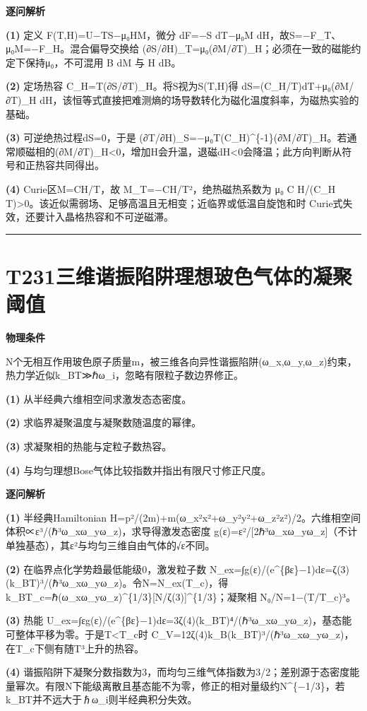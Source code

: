 \documentclass[UTF8,a4paper,11pt,oneside,openany]{ctexbook}
\begin{document}
\par\medskip\noindent\textbf{逐问解析}
\par\noindent\textbf{(1)} 定义 F(T,H)=U−TS−μ₀HM，微分 dF=−S dT−μ₀M dH，故S=−F\_T、μ₀M=−F\_H。混合偏导交换给 (∂S/∂H)\_T=μ₀(∂M/∂T)\_H；必须在一致的磁能约定下保持μ₀，不可混用 B dM 与 H dB。
\par\noindent\textbf{(2)} 定场热容 C\_H=T(∂S/∂T)\_H。将S视为S(T,H)得 dS=(C\_H/T)dT+μ₀(∂M/∂T)\_H dH，该恒等式直接把难测熵的场导数转化为磁化温度斜率，为磁热实验的基础。
\par\noindent\textbf{(3)} 可逆绝热过程dS=0，于是 (∂T/∂H)\_S=−μ₀T(C\_H)\textasciicircum{}\{-1\}(∂M/∂T)\_H。若通常顺磁相的(∂M/∂T)\_H<0，增加H会升温，退磁dH<0会降温；此方向判断从符号和正热容共同得出。
\par\noindent\textbf{(4)} Curie区M=CH/T，故 M\_T=−CH/T²，绝热磁热系数为 μ₀ C H/(C\_H T)>0。该近似需弱场、足够高温且无相变；近临界或低温自旋饱和时 Curie式失效，还要计入晶格热容和不可逆磁滞。

\par\bigskip\hrule\bigskip
\section*{T231\quad 三维谐振陷阱理想玻色气体的凝聚阈值}
\textbf{物理条件}\par N个无相互作用玻色原子质量m，被三维各向异性谐振陷阱(ω\_x,ω\_y,ω\_z)约束，热力学近似k\_BT≫ℏω\_i，忽略有限粒子数边界修正。
\par\noindent\textbf{(1)} 从半经典六维相空间求激发态态密度。
\par\noindent\textbf{(2)} 求临界凝聚温度与凝聚数随温度的幂律。
\par\noindent\textbf{(3)} 求凝聚相的热能与定粒子数热容。
\par\noindent\textbf{(4)} 与均匀理想Bose气体比较指数并指出有限尺寸修正尺度。

\par\medskip\noindent\textbf{逐问解析}
\par\noindent\textbf{(1)} 半经典Hamiltonian H=p²/(2m)+m(ω\_x²x²+ω\_y²y²+ω\_z²z²)/2。六维相空间体积∝ε³/(ℏ³ω\_xω\_yω\_z)，求导得激发态密度 g(ε)=ε²/[2ℏ³ω\_xω\_yω\_z]（不计单独基态），其ε²与均匀三维自由气体的√ε不同。
\par\noindent\textbf{(2)} 在临界点化学势趋最低能级0，激发粒子数 N\_ex=∫g(ε)/(e\textasciicircum{}\{βε\}−1)dε=ζ(3)(k\_BT)³/(ℏ³ω\_xω\_yω\_z)。令N=N\_ex(T\_c)，得 k\_BT\_c=ℏ(ω\_xω\_yω\_z)\textasciicircum{}\{1/3\}[N/ζ(3)]\textasciicircum{}\{1/3\}；凝聚相 N₀/N=1−(T/T\_c)³。
\par\noindent\textbf{(3)} 热能 U\_ex=∫εg(ε)/(e\textasciicircum{}\{βε\}−1)dε=3ζ(4)(k\_BT)⁴/(ℏ³ω\_xω\_yω\_z)，基态能可整体平移为零。于是T<T\_c时 C\_V=12ζ(4)k\_B(k\_BT)³/(ℏ³ω\_xω\_yω\_z)，在T\_c下侧有随T³上升的热容。
\par\noindent\textbf{(4)} 谐振陷阱下凝聚分数指数为3，而均匀三维气体指数为3/2；差别源于态密度能量幂次。有限N下能级离散且基态能不为零，修正的相对量级约N\textasciicircum{}\{−1/3\}，若k\_BT并不远大于ℏω\_i则半经典积分失效。
\end{document}
